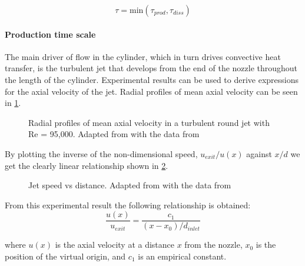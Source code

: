 \begin{equation}
\tau = \text{min}\left(\tau_{prod},\tau_{diss}\right)
\end{equation}



\paragraph{Production time scale}

The main driver of flow in the cylinder, which in turn drives convective heat transfer, is the turbulent jet that develops from the end of the nozzle throughout the length of the cylinder. Experimental results can be used to derive expressions for the axial velocity of the jet. Radial profiles of  mean axial velocity can be seen in \cref{fig:radialProfile}.

\begin{figure}[H]
\begin{centering}
\caption{Radial profiles of mean axial velocity in a turbulent round jet with Re = 95,000. Adapted from \cite{pope2000} with the data from \cite{hussein1994}}
\label{fig:radialProfile}
\end{centering}
\end{figure}


\noindent By plotting the inverse of the non-dimensional speed, $u_{exit}/u(x)$ against $x/d$ we get the clearly linear relationship shown in \cref{fig:jetSpeed}.

\begin{figure}[H]
\begin{centering}
\caption{Jet speed vs distance. Adapted from \cite{pope2000} with the data from \cite{hussein1994}}
\label{fig:jetSpeed}
\end{centering}
\end{figure}

\noindent From this experimental result the following relationship is obtained: 
\begin{equation}
\label{equ:axialSpeed}
\frac{u(x)}{u_{exit}} = \frac{c_1}{\left(x-x_0\right)/d_{inlet}}
\end{equation}

\noindent where $u(x)$ is the axial velocity at a distance $x$ from the nozzle, $x_0$ is the position of the virtual origin, and $c_1$ is an empirical constant.


